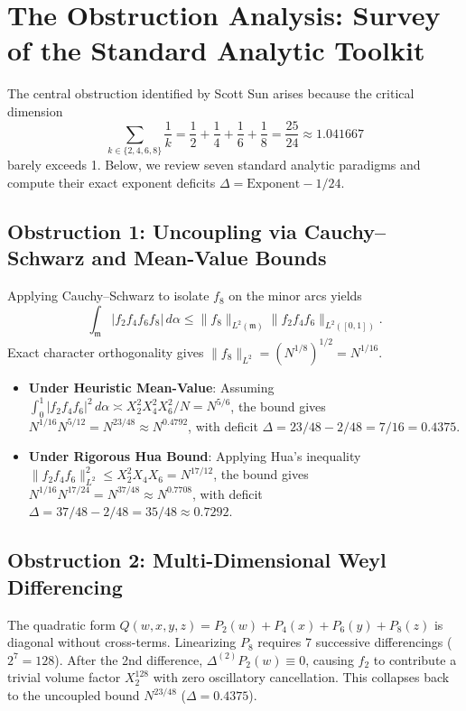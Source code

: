 \documentclass[11pt, a4paper]{article}
\theoremstyle{plain}
\theoremstyle{definition}
\begin{document}
\section{The Obstruction Analysis: Survey of the Standard Analytic Toolkit}
\label{sec:obstructions}

The central obstruction identified by Scott Sun \cite{scottsun2026v2} arises because the critical dimension
\begin{equation}
\sum_{k \in \{2,4,6,8\}} \frac{1}{k} = \frac{1}{2} + \frac{1}{4} + \frac{1}{6} + \frac{1}{8} = \frac{25}{24} \approx 1.041667
\end{equation}
barely exceeds 1. Below, we review seven standard analytic paradigms and compute their exact exponent deficits $\Delta = \text{Exponent} - 1/24$.

\subsection{Obstruction 1: Uncoupling via Cauchy--Schwarz and Mean-Value Bounds}
Applying Cauchy--Schwarz to isolate $f_8$ on the minor arcs yields
\[
\int_{\mathfrak{m}} |f_2 f_4 f_6 f_8|\,d\alpha \leq \|f_8\|_{L^2(\mathfrak{m})} \|f_2 f_4 f_6\|_{L^2([0,1])}.
\]
Exact character orthogonality gives $\|f_8\|_{L^2} = (N^{1/8})^{1/2} = N^{1/16}$.
\begin{itemize}
\item \textbf{Under Heuristic Mean-Value}: Assuming $\int_0^1 |f_2 f_4 f_6|^2\,d\alpha \asymp X_2^2 X_4^2 X_6^2 / N = N^{5/6}$, the bound gives $N^{1/16} N^{5/12} = N^{23/48} \approx N^{0.4792}$, with deficit $\Delta = 23/48 - 2/48 = 7/16 = 0.4375$.
\item \textbf{Under Rigorous Hua Bound}: Applying Hua's inequality $\|f_2 f_4 f_6\|_{L^2}^2 \leq X_2^2 X_4 X_6 = N^{17/12}$, the bound gives $N^{1/16} N^{17/24} = N^{37/48} \approx N^{0.7708}$, with deficit $\Delta = 37/48 - 2/48 = 35/48 \approx 0.7292$.
\end{itemize}

\subsection{Obstruction 2: Multi-Dimensional Weyl Differencing}
The quadratic form $Q(w,x,y,z) = P_2(w) + P_4(x) + P_6(y) + P_8(z)$ is diagonal without cross-terms. Linearizing $P_8$ requires 7 successive differencings ($2^7 = 128$). After the 2nd difference, $\Delta^{(2)} P_2(w) \equiv 0$, causing $f_2$ to contribute a trivial volume factor $X_2^{128}$ with zero oscillatory cancellation. This collapses back to the uncoupled bound $N^{23/48}$ ($\Delta = 0.4375$).
\end{document}
